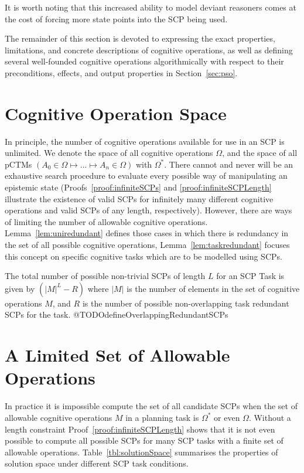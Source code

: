 It is worth noting that this increased ability to model deviant reasoners comes at the cost of forcing more state points into the SCP being used.

The remainder of this section is devoted to expressing the exact properties, limitations, and concrete descriptions of cognitive operations, as well as defining several well-founded cognitive operations algorithmically with respect to their preconditions, effects, and output properties in Section~\ref{sec:pso}.

\section{Cognitive Operation Space}
In principle, the number of cognitive operations available for use in an SCP is unlimited. We denote the space of all cognitive operations $\Omega$, and the space of all pCTMs $(A_0 \in \Omega \longmapsto ... \longmapsto A_n \in \Omega)$ with $\Omega^*$. There cannot and never will be an exhaustive search procedure to evaluate every possible way of manipulating an epistemic state (Proofs~\ref{proof:infiniteSCPs} and \ref{proof:infiniteSCPLength} illustrate the existence of valid SCPs for infinitely many different cognitive operations and valid SCPs of any length, respectively). However, there are ways of limiting the number of allowable cognitive operations. Lemma~\ref{lem:uniredundant} defines those cases in which there is redundancy in the set of all possible cognitive operations, Lemma~\ref{lem:taskredundant} focuses this concept on specific cognitive tasks which are to be modelled using SCPs.

The total number of possible non-trivial SCPs of length $L$ for an SCP Task is given by $(|M|^L - R)$ where $|M|$ is the number of elements in the set of cognitive operations $M$, and $R$ is the number of possible non-overlapping task redundant SCPs for the task. @TODOdefineOverlappingRedundantSCPs


\section{A Limited Set of Allowable Operations}
In practice it is impossible compute the set of all candidate SCPs when the set of allowable cognitive operations $M$ in a planning task is $\Omega^*$ or even $\Omega$. Without a length constraint Proof~\ref{proof:infiniteSCPLength} shows that it is not even possible to compute all possible SCPs for many SCP tasks with a finite set of allowable operations. Table~\ref{tbl:solutionSpace} summarises the properties of solution space under different SCP task conditions.

